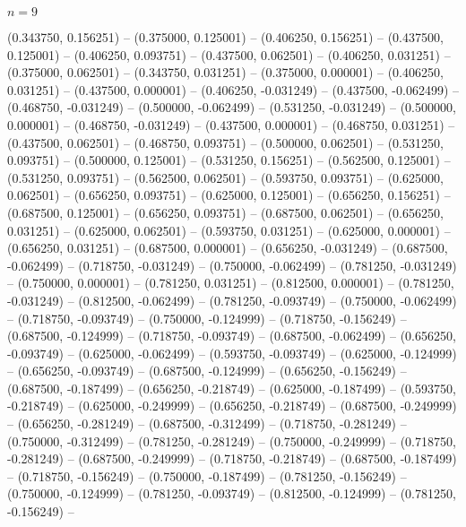 \begin{zzfrac}{$n = 9$}
\begin{scope}[shift={(0,0.5)}]
  (0.343750, 0.156251)   --
  (0.375000, 0.125001)   --
  (0.406250, 0.156251)   --
  (0.437500, 0.125001)   --
  (0.406250, 0.093751)   --
  (0.437500, 0.062501)   --
  (0.406250, 0.031251)   --
  (0.375000, 0.062501)   --
  (0.343750, 0.031251)   --
  (0.375000, 0.000001)   --
  (0.406250, 0.031251)   --
  (0.437500, 0.000001)   --
  (0.406250, -0.031249)  --
  (0.437500, -0.062499)  --
  (0.468750, -0.031249)  --
  (0.500000, -0.062499)  --
  (0.531250, -0.031249)  --
  (0.500000, 0.000001)   --
  (0.468750, -0.031249)  --
  (0.437500, 0.000001)   --
  (0.468750, 0.031251)   --
  (0.437500, 0.062501)   --
  (0.468750, 0.093751)   --
  (0.500000, 0.062501)   --
  (0.531250, 0.093751)   --
  (0.500000, 0.125001)   --
  (0.531250, 0.156251)   --
  (0.562500, 0.125001)   --
  (0.531250, 0.093751)   --
  (0.562500, 0.062501)   --
  (0.593750, 0.093751)   --
  (0.625000, 0.062501)   --
  (0.656250, 0.093751)   --
  (0.625000, 0.125001)   --
  (0.656250, 0.156251)   --
  (0.687500, 0.125001)   --
  (0.656250, 0.093751)   --
  (0.687500, 0.062501)   --
  (0.656250, 0.031251)   --
  (0.625000, 0.062501)   --
  (0.593750, 0.031251)   --
  (0.625000, 0.000001)   --
  (0.656250, 0.031251)   --
  (0.687500, 0.000001)   --
  (0.656250, -0.031249)  --
  (0.687500, -0.062499)  --
  (0.718750, -0.031249)  --
  (0.750000, -0.062499)  --
  (0.781250, -0.031249)  --
  (0.750000, 0.000001)   --
  (0.781250, 0.031251)   --
  (0.812500, 0.000001)   --
  (0.781250, -0.031249)  --
  (0.812500, -0.062499)  --
  (0.781250, -0.093749)  --
  (0.750000, -0.062499)  --
  (0.718750, -0.093749)  --
  (0.750000, -0.124999)  --
  (0.718750, -0.156249)  --
  (0.687500, -0.124999)  --
  (0.718750, -0.093749)  --
  (0.687500, -0.062499)  --
  (0.656250, -0.093749)  --
  (0.625000, -0.062499)  --
  (0.593750, -0.093749)  --
  (0.625000, -0.124999)  --
  (0.656250, -0.093749)  --
  (0.687500, -0.124999)  --
  (0.656250, -0.156249)  --
  (0.687500, -0.187499)  --
  (0.656250, -0.218749)  --
  (0.625000, -0.187499)  --
  (0.593750, -0.218749)  --
  (0.625000, -0.249999)  --
  (0.656250, -0.218749)  --
  (0.687500, -0.249999)  --
  (0.656250, -0.281249)  --
  (0.687500, -0.312499)  --
  (0.718750, -0.281249)  --
  (0.750000, -0.312499)  --
  (0.781250, -0.281249)  --
  (0.750000, -0.249999)  --
  (0.718750, -0.281249)  --
  (0.687500, -0.249999)  --
  (0.718750, -0.218749)  --
  (0.687500, -0.187499)  --
  (0.718750, -0.156249)  --
  (0.750000, -0.187499)  --
  (0.781250, -0.156249)  --
  (0.750000, -0.124999)  --
  (0.781250, -0.093749)  --
  (0.812500, -0.124999)  --
  (0.781250, -0.156249)  --

\end{scope}
\end{zzfrac}
